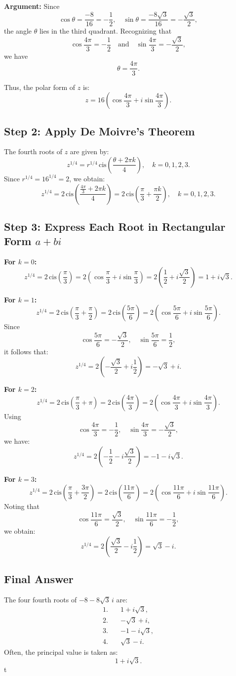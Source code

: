 \documentclass[12pt]{article}
\theoremstyle{definition} %
\theoremstyle{plain} %
\begin{document}
\textbf{Argument:}  
Since
\[
\cos\theta = \frac{-8}{16} = -\frac{1}{2}, \quad \sin\theta = \frac{-8\sqrt{3}}{16} = -\frac{\sqrt{3}}{2},
\]
the angle \(\theta\) lies in the third quadrant. Recognizing that
\[
\cos\frac{4\pi}{3} = -\frac{1}{2} \quad \text{and} \quad \sin\frac{4\pi}{3} = -\frac{\sqrt{3}}{2},
\]
we have
\[
\theta = \frac{4\pi}{3}.
\]

Thus, the polar form of \(z\) is:
\[
z = 16\left(\cos\frac{4\pi}{3} + i\sin\frac{4\pi}{3}\right).
\]

\subsection*{Step 2: Apply De Moivre's Theorem}
The fourth roots of \(z\) are given by:
\[
z^{1/4} = r^{1/4}\,\text{cis}\left(\frac{\theta+2\pi k}{4}\right),\quad k=0,1,2,3.
\]
Since \(r^{1/4}=16^{1/4}=2\), we obtain:
\[
z^{1/4} = 2\,\text{cis}\left(\frac{\frac{4\pi}{3}+2\pi k}{4}\right)
= 2\,\text{cis}\left(\frac{\pi}{3}+\frac{\pi k}{2}\right),\quad k=0,1,2,3.
\]

\subsection*{Step 3: Express Each Root in Rectangular Form \(a+bi\)}

\textbf{For \(k=0\):}
\[
z^{1/4} = 2\,\text{cis}\left(\frac{\pi}{3}\right)
= 2\left(\cos\frac{\pi}{3}+i\sin\frac{\pi}{3}\right)
= 2\left(\frac{1}{2}+i\frac{\sqrt{3}}{2}\right)
= 1+i\sqrt{3}.
\]

\textbf{For \(k=1\):}
\[
z^{1/4} = 2\,\text{cis}\left(\frac{\pi}{3}+\frac{\pi}{2}\right)
= 2\,\text{cis}\left(\frac{5\pi}{6}\right)
= 2\left(\cos\frac{5\pi}{6}+i\sin\frac{5\pi}{6}\right).
\]
Since
\[
\cos\frac{5\pi}{6} = -\frac{\sqrt{3}}{2},\quad \sin\frac{5\pi}{6} = \frac{1}{2},
\]
it follows that:
\[
z^{1/4} = 2\left(-\frac{\sqrt{3}}{2}+i\frac{1}{2}\right)
= -\sqrt{3}+i.
\]

\textbf{For \(k=2\):}
\[
z^{1/4} = 2\,\text{cis}\left(\frac{\pi}{3}+\pi\right)
= 2\,\text{cis}\left(\frac{4\pi}{3}\right)
= 2\left(\cos\frac{4\pi}{3}+i\sin\frac{4\pi}{3}\right).
\]
Using
\[
\cos\frac{4\pi}{3} = -\frac{1}{2},\quad \sin\frac{4\pi}{3} = -\frac{\sqrt{3}}{2},
\]
we have:
\[
z^{1/4} = 2\left(-\frac{1}{2}-i\frac{\sqrt{3}}{2}\right)
= -1-i\sqrt{3}.
\]

\textbf{For \(k=3\):}
\[
z^{1/4} = 2\,\text{cis}\left(\frac{\pi}{3}+\frac{3\pi}{2}\right)
= 2\,\text{cis}\left(\frac{11\pi}{6}\right)
= 2\left(\cos\frac{11\pi}{6}+i\sin\frac{11\pi}{6}\right).
\]
Noting that
\[
\cos\frac{11\pi}{6} = \frac{\sqrt{3}}{2},\quad \sin\frac{11\pi}{6} = -\frac{1}{2},
\]
we obtain:
\[
z^{1/4} = 2\left(\frac{\sqrt{3}}{2}-i\frac{1}{2}\right)
= \sqrt{3}-i.
\]

\subsection*{Final Answer}
The four fourth roots of \(-8-8\sqrt{3}\,i\) are:
\[
\boxed{
\begin{aligned}
1.\quad &1+i\sqrt{3},\\[1mm]
2.\quad &-\sqrt{3}+i,\\[1mm]
3.\quad &-1-i\sqrt{3},\\[1mm]
4.\quad &\sqrt{3}-i.
\end{aligned}
}
\]
Often, the principal value is taken as:
\[
\boxed{1+i\sqrt{3}}.
\]t
\end{document}
